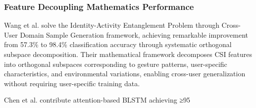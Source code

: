 \documentclass[journal]{IEEEtran}
\begin{document}
\subsubsection{Feature Decoupling Mathematics Performance}

Wang et al. \cite{wang2024feature} solve the Identity-Activity Entanglement Problem through Cross-User Domain Sample Generation framework, achieving remarkable improvement from 57.3\% to 98.4\% classification accuracy through systematic orthogonal subspace decomposition. Their mathematical framework decomposes CSI features into orthogonal subspaces corresponding to gesture patterns, user-specific characteristics, and environmental variations, enabling cross-user generalization without requiring user-specific training data.

Chen et al. \cite{chen2018wifi} contribute attention-based BLSTM achieving ≥95%
\end{document}
